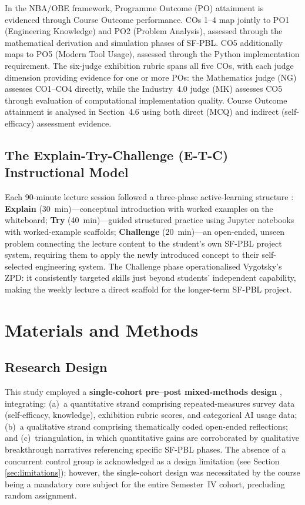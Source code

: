\documentclass[utf8]{FrontiersinHarvard}
\begin{document}
{\color{blue} In the NBA/OBE framework, Programme Outcome (PO) attainment is evidenced
through Course Outcome performance. COs 1--4 map jointly to PO1 (Engineering
Knowledge) and PO2 (Problem Analysis), assessed through the mathematical
derivation and simulation phases of SF-PBL. CO5 additionally maps to PO5
(Modern Tool Usage), assessed through the Python implementation requirement.
The six-judge exhibition rubric spans all five COs, with each judge
dimension providing evidence for one or more POs: the Mathematics judge
(NG) assesses CO1--CO4 directly, while the Industry~4.0 judge (MK) assesses
CO5 through evaluation of computational implementation quality. Course
Outcome attainment is analysed in Section~4.6 using both direct (MCQ) and
indirect (self-efficacy) assessment evidence.}

\subsection{The Explain-Try-Challenge (E-T-C) Instructional Model}
\label{sec:etc}

Each 90-minute lecture session followed a three-phase active-learning
structure \citep{prince2006inductive}: \textbf{Explain} (30~min)---conceptual
introduction with worked examples on the whiteboard; \textbf{Try}
(40~min)---guided structured practice using Jupyter notebooks with worked-example
scaffolds; \textbf{Challenge} (20~min)---an open-ended, unseen problem
connecting the lecture content to the student's own SF-PBL project system,
requiring them to apply the newly introduced concept to their self-selected
engineering system. The Challenge phase operationalised Vygotsky's ZPD:
it consistently targeted skills just beyond students' independent capability,
making the weekly lecture a direct scaffold for the longer-term SF-PBL project.

\section{Materials and Methods}

\subsection{Research Design}

This study employed a \textbf{single-cohort pre--post mixed-methods design}
\citep{creswell2018designing}, integrating: (a)~a quantitative strand
comprising repeated-measures survey data (self-efficacy, knowledge),
exhibition rubric scores, and categorical AI usage data; (b)~a qualitative
strand comprising thematically coded open-ended reflections; and
(c)~triangulation, in which quantitative gains are corroborated by
qualitative breakthrough narratives referencing specific SF-PBL phases.
The absence of a concurrent control group is acknowledged as a design
limitation (see Section \ref{sec:limitations}); however, the single-cohort
design was necessitated by the course being a mandatory core subject for
the entire Semester~IV cohort, precluding random assignment.
\end{document}
